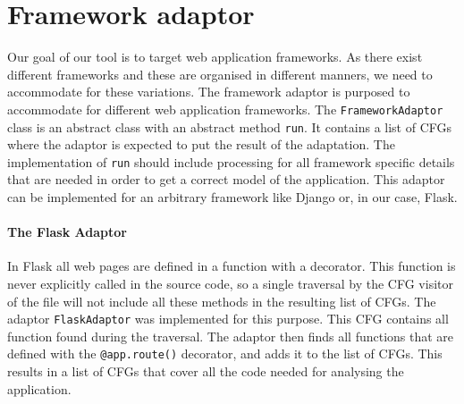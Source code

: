 \section{Framework adaptor}
Our goal of our tool is to target web application frameworks.
As there exist different frameworks and these are organised in different manners, we need to accommodate for these variations.
The framework adaptor is purposed to accommodate for different web application frameworks.
The \texttt{FrameworkAdaptor} class is an abstract class with an abstract method \texttt{run}.
It contains a list of CFGs where the adaptor is expected to put the result of the adaptation.
The implementation of \texttt{run} should include processing for all framework specific details that are needed in order to get a correct model of the application.
This adaptor can be implemented for an arbitrary framework like Django or, in our case, Flask.

\paragraph{The Flask Adaptor}
In Flask all web pages are defined in a function with a decorator.
This function is never explicitly called in the source code, so a single traversal by the CFG visitor of the file will not include all these methods in the resulting list of CFGs.
The adaptor \texttt{FlaskAdaptor} was implemented for this purpose.
This CFG contains all function found during the traversal.
The adaptor then finds all functions that are defined with the \texttt{@app.route()} decorator, and adds it to the list of CFGs.
This results in a list of CFGs that cover all the code needed for analysing the application.
